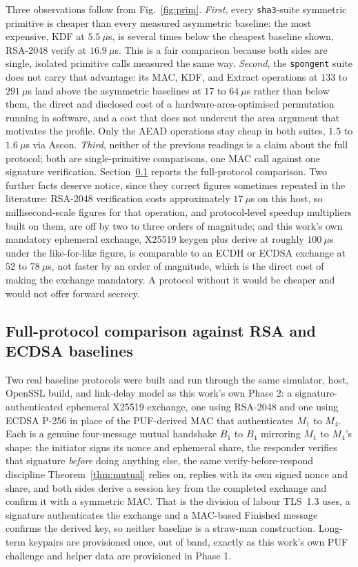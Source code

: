 \documentclass[journal]{IEEEtran}
\begin{document}
Three observations follow from Fig.~\ref{fig:prim}. \emph{First}, every
\texttt{sha3}-suite symmetric primitive is cheaper than every measured
asymmetric baseline: the most expensive, KDF at $5.5~\mu$s, is several times
below the cheapest baseline shown, RSA-2048 verify at $16.9~\mu$s. This
is a fair comparison because both sides are single, isolated primitive calls
measured the same way. \emph{Second}, the \texttt{spongent} suite does not
carry that advantage: its MAC, KDF, and Extract operations at $133$ to
$291~\mu$s land above the asymmetric baselines at $17$ to $64~\mu$s rather
than below them, the direct and disclosed cost of
a hardware-area-optimised permutation running in software, and a cost that does
not undercut the area argument that motivates the profile. Only the AEAD
operations stay cheap in both suites, $1.5$ to $1.6~\mu$s via Ascon.
\emph{Third}, neither of the previous readings is a claim about the full
protocol; both are single-primitive comparisons, one MAC call against one
signature verification. Section~\ref{sec:baseline} reports the full-protocol
comparison. Two further facts deserve notice, since they correct figures
sometimes repeated in the literature: RSA-2048 verification costs approximately
$17~\mu$s on this host, so millisecond-scale figures for that operation, and
protocol-level speedup multipliers built on them, are off by two to three
orders of magnitude; and this work's own mandatory ephemeral exchange, X25519
keygen plus derive at roughly $100~\mu$s under the like-for-like figure, is
comparable to an ECDH or ECDSA exchange at $52$ to $78~\mu$s, not faster by an
order of magnitude, which is the direct cost of making the exchange mandatory.
A protocol without it would be cheaper and would not offer forward secrecy.

\subsection{Full-protocol comparison against RSA and ECDSA baselines}
\label{sec:baseline}

Two real baseline protocols were built and run through the same simulator,
host, OpenSSL build, and link-delay model as this work's own Phase 2: a
signature-authenticated ephemeral X25519 exchange, one using RSA-2048 and one
using ECDSA P-256 in place of the PUF-derived MAC that authenticates
$M_1$ to $M_4$. Each is a genuine four-message mutual handshake $B_1$ to $B_4$
mirroring $M_1$ to $M_4$'s shape: the initiator signs its nonce and ephemeral
share, the responder verifies that signature \emph{before} doing anything else,
the same verify-before-respond discipline Theorem~\ref{thm:mutual} relies on,
replies with its own signed nonce and share, and both sides derive a session
key from the completed exchange and confirm it with a symmetric MAC. That is
the division of labour TLS~1.3 uses, a signature authenticates the exchange and
a MAC-based Finished message confirms the derived key, so neither baseline is a
straw-man construction. Long-term keypairs are provisioned once, out of band,
exactly as this work's own PUF challenge and helper data are provisioned in
Phase 1.
\end{document}
